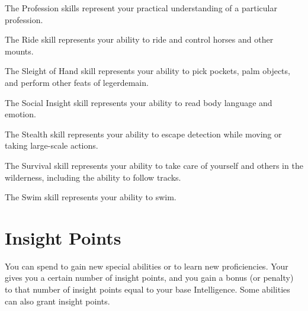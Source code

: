 \begin{raggeditemize}
        \item The Profession skills represent your practical understanding of a particular profession.
        \item The Ride skill represents your ability to ride and control horses and other mounts.
        \item The Sleight of Hand skill represents your ability to pick pockets, palm objects, and perform other feats of legerdemain.
        \item The Social Insight skill represents your ability to read body language and emotion.
        \item The Stealth skill represents your ability to escape detection while moving or taking large-scale actions.
        \item The Survival skill represents your ability to take care of yourself and others in the wilderness, including the ability to follow tracks.
        \item The Swim skill represents your ability to swim.
    \end{raggeditemize}

\section{Insight Points}\label{Insight Points}
    You can spend  to gain new special abilities or to learn new proficiencies.
    Your  gives you a certain number of insight points, and you gain a bonus (or penalty) to that number of insight points equal to your base Intelligence.
    Some abilities can also grant insight points.


